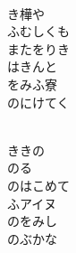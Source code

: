 \documentclass[10pt,b5j]{tarticle} %
\begin{document}
\begin{enumerate}
\begin{minipage}[c]{\blocksize}
        \vspace{\linespace}
        \item~\\
        き樺や\\
        ふむしくも\\
        またをりき\\
        はきんと\\
        をみふ寮\\
        のにけてく
        
    \end{minipage}
    \begin{minipage}[c]{\blocksize}
        
        \vspace{\linespace}
        \item~\\
        ききの\\
        のる\\
        のはこめて\\
        ふアイヌ\\
        のをみし\\
        のぶかな
    
    \end{minipage}
\end{enumerate} %
\end{document}
